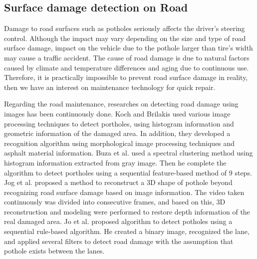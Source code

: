 \documentclass{ieeeaccess}
\begin{document}
\subsection{Surface damage detection on Road}
\label{subsec: surface damage}
Damage to road surfaces such as potholes seriously affects the driver's steering control. Although the impact may vary depending on the size and type of road surface damage, impact on the vehicle due to the pothole larger than tire's width may cause a traffic accident. The cause of road damage is due to natural factors caused by climate and temperature differences and aging due to continuous use. Therefore, it is practically impossible to prevent road surface damage in reality, then we have an interest on maintenance technology for quick repair. 

Regarding the road maintenance, researches on detecting road damage using images has been continuously done. Koch and Brilakis\cite{b33} used various image processing techniques to detect portholes, using histogram information and geometric information of the damaged area. In addition, they developed a recognition algorithm using morphological image processing techniques and asphalt material information. Buza et al.\cite{b34} used a spectral clustering method using histogram information extracted from gray image. Then he complete the algorithm to detect portholes using a sequential feature-based method of 9 steps. Jog et al.\cite{b35} proposed a method to reconstruct a 3D shape of pothole beyond recognizing road surface damage based on image information. The video taken continuously was divided into consecutive frames, and based on this, 3D reconstruction and modeling were performed to restore depth information of the real damaged area. Jo et al.\cite{b36} proposed algorithm to detect potholes using a sequential rule-based algorithm. He created a binary image, recognized the lane, and applied several filters to detect road damage with the assumption that pothole exists between the lanes. 
\end{document}
